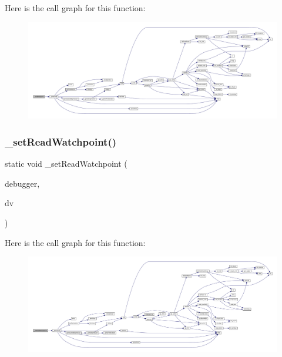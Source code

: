 Here is the call graph for this function\+:
\nopagebreak
\begin{figure}[H]
\begin{center}
\leavevmode
\includegraphics[width=350pt]{debugger_2cli-debugger_8c_a0a52c3456f6b68ef9b560a42b816794c_cgraph}
\end{center}
\end{figure}
\mbox{\label{debugger_2cli-debugger_8c_a0f7e98d855bf3ce2a7114f3f24336dfb}} 
\subsubsection{\texorpdfstring{\+\_\+set\+Read\+Watchpoint()}{\_setReadWatchpoint()}}
{\footnotesize\ttfamily static void \+\_\+set\+Read\+Watchpoint (\begin{DoxyParamCaption}\item[{struct C\+L\+I\+Debugger $\ast$}]{debugger,  }\item[{struct C\+L\+I\+Debug\+Vector $\ast$}]{dv }\end{DoxyParamCaption})\hspace{0.3cm}{\ttfamily [static]}}

Here is the call graph for this function\+:
\nopagebreak
\begin{figure}[H]
\begin{center}
\leavevmode
\includegraphics[width=350pt]{debugger_2cli-debugger_8c_a0f7e98d855bf3ce2a7114f3f24336dfb_cgraph}
\end{center}
\end{figure}
\mbox{\label{debugger_2cli-debugger_8c_a17749710370e117b89191f855280b6a1}} 
